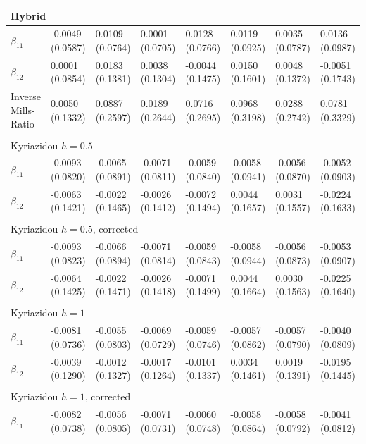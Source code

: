 \begin{table}
\begin{adjustwidth}{-.5in}{-.5in}
\begin{tabular}{p{3cm}p{1.3cm}p{1.3cm}p{1.3cm}p{1.3cm}p{1.3cm}p{1.3cm}p{1.3cm}}
     \hline
   \multicolumn{8}{l}{Hybrid} \\
   \hline
    $\beta_{11}$  & -0.0049 (0.0587) & 0.0109 (0.0764) & 0.0001 (0.0705)& 0.0128 (0.0766) & 0.0119 (0.0925) & 0.0035 (0.0787)  & 0.0136 (0.0987)\\
    $\beta_{12}$  & 0.0001 (0.0854) &  0.0183 (0.1381) & 0.0038 (0.1304)& -0.0044 (0.1475) & 0.0150 (0.1601) & 0.0048 (0.1372) & -0.0051 (0.1743)\\
    Inverse Mills-Ratio  & 0.0050 (0.1332) &  0.0887 (0.2597) & 0.0189 (0.2644) & 0.0716 (0.2695) & 0.0968 (0.3198) & 0.0288 (0.2742) & 0.0781 (0.3329)\\
     & & & & & & & \\
    \hline
    \multicolumn{8}{l}{Kyriazidou $h=0.5$} \\
   \hline
    $\beta_{11}$  & -0.0093 (0.0820) & -0.0065 (0.0891) & -0.0071 (0.0811) & -0.0059 (0.0840) & -0.0058 (0.0941) & -0.0056 (0.0870) & -0.0052 (0.0903)\\
    $\beta_{12}$  & -0.0063 (0.1421) & -0.0022 (0.1465) & -0.0026 (0.1412) & -0.0072 (0.1494) &  0.0044 (0.1657) &  0.0031 (0.1557) & -0.0224 (0.1633)\\
     & & & & & & & \\
    \hline
    \multicolumn{8}{l}{Kyriazidou $h=0.5$, corrected} \\
   \hline
    $\beta_{11}$  & -0.0093 (0.0823) & -0.0066 (0.0894) & -0.0071 (0.0814) &  -0.0059 (0.0843) & -0.0058 (0.0944) & -0.0056 (0.0873) & -0.0053 (0.0907) \\
    $\beta_{12}$  & -0.0064 (0.1425) & -0.0022 (0.1471) & -0.0026 (0.1418) &  -0.0071 (0.1499) & 0.0044 (0.1664) &  0.0030 (0.1563) & -0.0225 (0.1640)\\
     & & & & & & & \\
    \hline
    \multicolumn{8}{l}{Kyriazidou $h=1$} \\
   \hline
    $\beta_{11}$  & -0.0081 (0.0736) & -0.0055 (0.0803) & -0.0069 (0.0729) & -0.0059 (0.0746) & -0.0057 (0.0862) &  -0.0057 (0.0790)& -0.0040 (0.0809)\\
    $\beta_{12}$  & -0.0039 (0.1290) & -0.0012 (0.1327) & -0.0017 (0.1264) & -0.0101 (0.1337)  & 0.0034 (0.1461) &  0.0019 (0.1391) & -0.0195 (0.1445)\\
     & & & & & & & \\
        \hline
    \multicolumn{8}{l}{Kyriazidou $h=1$, corrected} \\
   \hline
    $\beta_{11}$  & -0.0082 (0.0738) & -0.0056 (0.0805) & -0.0071 (0.0731) &  -0.0060 (0.0748) & -0.0058 (0.0864) & -0.0058 (0.0792) & -0.0041 (0.0812)\\

\end{tabular}
\end{adjustwidth}
\end{table}

